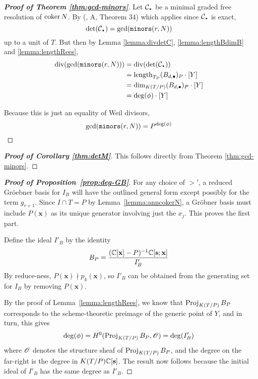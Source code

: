 \documentclass[fleqn,reqno]{amsart}
\begin{document}
\begin{proof}[\bf Proof of Theorem \ref{thm:gcd-minors}]
Let $\mathcal{C}_\nbul$ be a minimal graded free resolution of $\operatorname{coker} N$.
By (\citet{GKZ94}, A, Theorem 34) which applies since $\mathcal{C}_\nbul$ is exact,
\[
	\det(\mathcal{C}_\nbul)=\gcd(\mt{minors}(r,N))
\]
up to a unit of $T$. But then by Lemma \ref{lemma:divdetC}, \ref{lemma:lengthBdimB} and \ref{lemma:lengthRees},
\begin{align*}
\thediv(\gcd(\mt{minors}(r,N)))&=\thediv(\det(\mathcal{C}_\nbul))\\
&=\length_{T_P} (B_{d,\bullet})_P\cdot[Y]\\
&=\dim_{K(T/P)} (B_{d,\bullet})_P\cdot[Y]\\
&=\deg(\phi)\cdot[Y]
\end{align*}

Because this is just an equality of Weil divisors,
\[
\gcd(\mathop{\tt minors}(r,N))=P^{\deg(\phi)}\qedhere
\]
\end{proof}

\begin{proof}[\bf Proof of Corollary \ref{thm:detM}]
This follows directly from Theorem \ref{thm:gcd-minors}.
\end{proof}

\begin{proof}[\bf Proof of Proposition~\ref{prop:deg-GB}]
For any choice of $>'$, a reduced Gr\"oebner basis for $I_B$ will have the outlined general form
except possibly for the term $g_{r+1}$.
Since $I\cap T=P$ by Lemma~\ref{lemma:anncokerN},
a Gr\"obner basis must include $P(\mathbf x)$ as its unique generator involving just the $x_j$.
This proves the first part.

Define the ideal $I'_B$ by the identity
\[
	B_P=\frac{(\mathbb{C}[\mathbf x]-P)^{-1}\mathbb{C}[\mathbf s;\mathbf x]}{I'_B}
\]
By reduce-ness, $P(\mathbf x)\nmid p_k(\mathbf x)$,
so $I'_B$ can be obtained from the generating set for $I_B$ by removing $P(\mathbf x)$.

By the proof of Lemma~\ref{lemma:lengthRees},
we know that $\operatorname{Proj}_{K(T/P)} B_P$ corresponds to
the scheme-theoretic preimage of the generic point of $Y$,
and in turn, this gives
\[
	\deg(\phi)=H^0(\operatorname{Proj}_{K(T/P)} B_P,\mathscr{O})=\deg(I'_B)
\]
where $\mathscr{O}$ denotes the structure sheaf of $\operatorname{Proj}_{K(T/P)} B_P$,
and the degree on the far-right is the degree in $K(T/P)\mathbb{C}[\mathbf s]$.
The result now follows because the initial ideal of $I'_B$ has the same degree as $I'_B$.
\end{proof}
\end{document}
